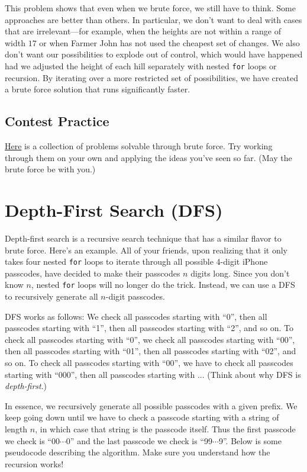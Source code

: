 This problem shows that even when we brute force, we still have to think. Some approaches are better than others. In particular, we don't want to deal with cases that are irrelevant---for example, when the heights are not within a range of width $17$ or when Farmer John has not used the cheapest set of changes. We also don't want our possibilities to explode out of control, which would have happened had we adjusted the height of each hill separately with nested \texttt{for} loops or recursion. By iterating over a more restricted set of possibilities, we have created a brute force solution that runs significantly faster.

\subsection{Contest Practice}

\href{http://codeforces.com/group/iMPx86rZXm/contest/204642}{Here} is a collection of problems solvable through brute force. Try working through them on your own and applying the ideas you've seen so far. (May the brute force be with you.)

\section{Depth-First Search (DFS)}

Depth-first search is a recursive search technique that has a similar flavor to brute force. Here's an example. All of your friends, upon realizing that it only takes four nested \texttt{for} loops to iterate through all possible 4-digit iPhone passcodes, have decided to make their passcodes $n$ digits long. Since you don't know $n$, nested \texttt{for} loops will no longer do the trick. Instead, we can use a DFS to recursively generate all $n$-digit passcodes.

DFS works as follows: We check all passcodes starting with ``0'', then all passcodes starting with ``1'', then all passcodes starting with ``2'', and so on. To check all passcodes starting with ``0'', we check all passcodes starting with ``00'', then all passcodes starting with ``01'', then all passcodes starting with ``02'', and so on. To check all passcodes starting with ``00'', we have to check all passcodes starting with ``000'', then all passcodes starting with ... (Think about why DFS is \emph{depth-first}.)

In essence, we recursively generate all possible passcodes with a given prefix. We keep going down until we have to check a passcode starting with a string of length $n$, in which case that string is the passcode itself. Thus the first passcode we check is ``00$\cdots$0'' and the last passcode we check is ``99$\cdots$9''. Below is some pseudocode describing the algorithm. Make sure you understand how the recursion works!

